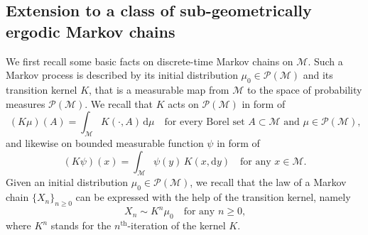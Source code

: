 \documentclass[11pt,a4paper,oneside]{amsart}
\numberwithin{equation}{section}
\newcommand{\dd}{\mathrm{d}}
\newcommand{\nc}[1]{\textcolor{red}{[N: #1]}}
\begin{document}
\subsection{Extension to a class of sub-geometrically ergodic Markov chains}\label{Examples}
%
We first recall some basic facts on discrete-time Markov chains on $\mathcal{M}$. Such a Markov process is described by its initial distribution $\mu_0 \in \mathcal{P}(\mathcal{M})$ and its transition kernel $K$, that is a measurable map from $\mathcal{M}$ to the space of probability measures $\mathcal{P}(\mathcal{M})$. We recall that $K$ acts on $\mathcal{P}(\mathcal{M})$ in form of 
%
\begin{equation}\label{eq:actionkernel}
%
(K\mu)(A) = \int_{\mathcal{M}} K(\cdot,A)\,\dd\mu\quad\text{for every Borel set $A\subset \mathcal{M}$ and $\mu\in \mathcal{P}(\mathcal{M})$,}
%
\end{equation}
%
and likewise on bounded measurable function $\psi$ in form of
%
\begin{equation}\label{eq:actionkernelBis}
%
(K\psi)(x) = \int_{\mathcal{M}} \psi(y) \,K(x, \dd y)\quad\text{for any $x\in\mathcal{M}$.}
%
\end{equation}
%
Given an initial distribution $\mu_0\in \mathcal{P}(\mathcal{M})$, we recall that the law of a Markov chain $\{X_n\}_{n\geq 0}$ can be expressed with the help of the transition kernel, namely 
%
\begin{equation}\label{LawOfTheChain}
%
X_n\sim K^n\mu_0\quad\text{for any $n\geq 0$,}
%
\end{equation}
%
where $K^n$ stands for the $n^{\mathrm{th}}$-iteration of the kernel $K$. 
\end{document}
